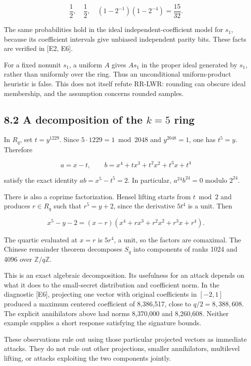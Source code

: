 \documentclass[
  american,
  10pt,
  a4paper,
]{article}
\begin{document}
\[
\frac12,\quad\frac12,\quad
(1-2^{-1})(1-2^{-4})=\frac{15}{32}.
\]

The same probabilities hold in the ideal independent-coefficient model
for \(s_1\), because its coefficient intervals give unbiased independent
parity bits. These facts are verified in {[}E2, E6{]}.

For a fixed nonunit \(s_1\), a uniform \(A\) gives \(As_1\) in the
proper ideal generated by \(s_1\), rather than uniformly over the ring.
Thus an unconditional uniform-product heuristic is false. This does not
itself refute RR-LWR: rounding can obscure ideal membership, and the
assumption concerns rounded samples.

\subsection{\texorpdfstring{8.2 A decomposition of the \(k=5\)
ring}{8.2 A decomposition of the k=5 ring}}\label{a-decomposition-of-the-k5-ring}

In \(R_q\), set \(t=y^{1229}\). Since \(5\cdot1229=1\bmod2048\) and
\(y^{2048}=1\), one has \(t^5=y\). Therefore

\[
a=x-t,\qquad
b=x^4+tx^3+t^2x^2+t^3x+t^4
\]

satisfy the exact identity \(ab=x^5-t^5=2\). In particular,
\(a^{24}b^{24}=0\) modulo \(2^{24}\).

There is also a coprime factorization. Hensel lifting starts from
\(t\bmod2\) and produces \(r\in R_q\) such that \(r^5=y+2\), since the
derivative \(5t^4\) is a unit. Then

\[
x^5-y-2=(x-r)
(x^4+rx^3+r^2x^2+r^3x+r^4).
\]

The quartic evaluated at \(x=r\) is \(5r^4\), a unit, so the factors are
comaximal. The Chinese remainder theorem decomposes \(S_q\) into
components of ranks 1024 and 4096 over \(\mathbb Z/q\mathbb Z\).

This is an exact algebraic decomposition. Its usefulness for an attack
depends on what it does to the small-secret distribution and coefficient
norm. In the diagnostic {[}E6{]}, projecting one vector with original
coefficients in \([-2,1]\) produced a maximum centered coefficient of
8,386,517, close to \(q/2=8,388,608\). The explicit annihilators above
had norms 8,370,000 and 8,260,608. Neither example supplies a short
response satisfying the signature bounds.

These observations rule out using those particular projected vectors as
immediate attacks. They do not rule out other projections, smaller
annihilators, multilevel lifting, or attacks exploiting the two
components jointly.
\end{document}
